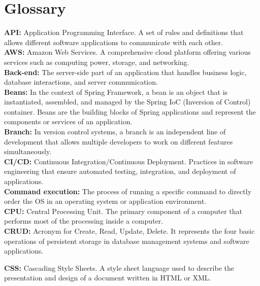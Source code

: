 \section{Glossary}

\textbf{API:} Application Programming Interface. A set of rules and definitions that allows different software applications to communicate with each other.\\

\textbf{AWS:} Amazon Web Services. A comprehensive cloud platform offering various services such as computing power, storage, and networking.\\

\textbf{Back-end:} The server-side part of an application that handles business logic, database interactions, and server communication.\\


\textbf{Beans:} In the context of Spring Framework, a bean is an object that is instantiated, assembled, and managed by the Spring IoC (Inversion of Control) container. Beans are the building blocks of Spring applications and represent the components or services of an application.\\

\textbf{Branch:} In version control systems, a branch is an independent line of development that allows multiple developers to work on different features simultaneously.\\

\textbf{CI/CD:} Continuous Integration/Continuous Deployment. Practices in software engineering that ensure automated testing, integration, and deployment of applications.\\

\textbf{Command execution:} The process of running a specific command to directly order the OS in an operating system or application environment.\\

\textbf{CPU:} Central Processing Unit. The primary component of a computer that performs most of the processing inside a computer.\\

\textbf{CRUD:} Acronym for Create, Read, Update, Delete. It represents the four basic operations of persistent storage in database management systems and software applications.

\textbf{CSS:} Cascading Style Sheets. A style sheet language used to describe the presentation and design of a document written in HTML or XML.\\

